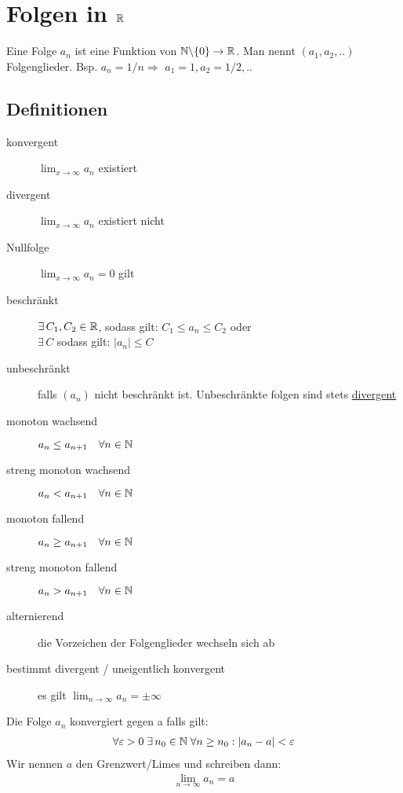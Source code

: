 \section{Folgen in $\mathbb{R}$}
Eine Folge $a_n$ ist eine Funktion von $\mathbb{N} \backslash \{0\} \to \mathbb{R}$. Man nennt $(a_1, a_2, .. )$ Folgenglieder. Bsp. $a_n = 1/n \Rightarrow$  $a_1 = 1, a_2 = 1/2, ..$  

\subsection{Definitionen}
\begin{description}
  \item[konvergent] $\lim_{x \to \infty} a_n$ existiert 
  \item[divergent] $\lim_{x \to \infty} a_n$ existiert nicht 
  \item[Nullfolge] $\lim_{x \to \infty} a_n = 0$ gilt 
  \item[beschränkt] $\exists \, C_1, C_2 \in \mathbb{R}$, sodass gilt: $C_1 \leq a_n \leq C_2$ \hspace{0.3cm} oder\\
  $\exists \, C$ sodass gilt: $|a_n| \leq C$
  \item[unbeschränkt] falls $(a_n)$ nicht beschränkt ist. Unbeschränkte folgen
  sind stets \underline{divergent}
  \item[monoton wachsend] $a_n \leq a_{n+1} \quad \forall n \in \mathbb{N}$ 
  \item[streng monoton wachsend] $a_n < a_{n+1} \quad \forall n \in \mathbb{N}$
  \item[monoton fallend] $a_n \geq a_{n+1} \quad \forall n \in \mathbb{N}$
  \item[streng monoton fallend] $a_n > a_{n+1} \quad \forall n \in \mathbb{N}$
  \item[alternierend] {\small die Vorzeichen der Folgenglieder wechseln sich ab}
  \item[bestimmt divergent / uneigentlich konvergent] es gilt $\lim_{n \to
  \infty} a_n = \pm \infty$
\end{description}

\begin{definition} 
Die Folge $a_n$ konvergiert gegen a falls gilt:\\
\vspace{-0.3cm}\begin{align*}
\forall \varepsilon > 0 \; \exists \, n_0 \in \mathbb{N} \; \forall n \geq n_0: |a_n - a| < \varepsilon
\end{align*}
Wir nennen $a$ den Grenzwert/Limes und schreiben dann:
\begin{align*}
	\lim_{n \to \infty} a_n = a
\end{align*}
\end{definition}

